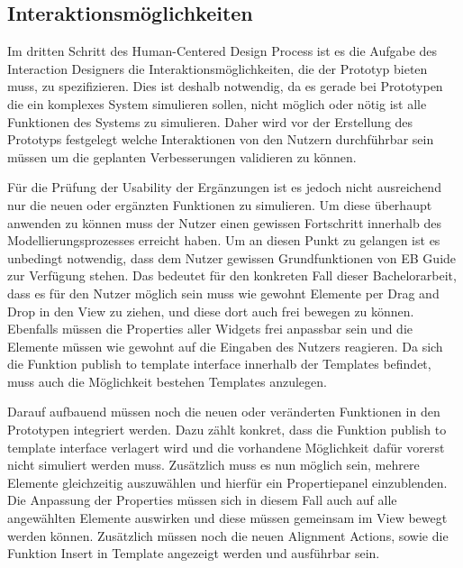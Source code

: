 \subsection{Interaktionsmöglichkeiten}

Im dritten Schritt des Human-Centered Design Process ist es die Aufgabe des Interaction Designers die Interaktionsmöglichkeiten, die der Prototyp bieten muss, zu spezifizieren.
Dies ist deshalb notwendig, da es gerade bei Prototypen die ein komplexes System simulieren sollen, nicht möglich oder nötig ist alle Funktionen des Systems zu simulieren.
Daher wird vor der Erstellung des Prototyps festgelegt welche Interaktionen von den Nutzern durchführbar sein müssen um die geplanten Verbesserungen validieren zu können.

Für die Prüfung der Usability der Ergänzungen ist es jedoch nicht ausreichend nur die neuen oder ergänzten Funktionen zu simulieren.
Um diese überhaupt anwenden zu können muss der Nutzer einen gewissen Fortschritt innerhalb des Modellierungsprozesses erreicht haben.
Um an diesen Punkt zu gelangen ist es unbedingt notwendig, dass dem Nutzer gewissen Grundfunktionen von EB Guide zur Verfügung stehen.
Das bedeutet für den konkreten Fall dieser Bachelorarbeit, dass es für den Nutzer möglich sein muss wie gewohnt Elemente per Drag and Drop in den View zu ziehen, und diese dort auch frei bewegen zu können.
Ebenfalls müssen die Properties aller Widgets frei anpassbar sein und die Elemente müssen wie gewohnt auf die Eingaben des Nutzers reagieren.
Da sich die Funktion \glqq publish to template interface\grqq{} innerhalb der Templates befindet, muss auch die Möglichkeit bestehen Templates anzulegen.

Darauf aufbauend müssen noch die neuen oder veränderten Funktionen in den Prototypen integriert werden.
Dazu zählt konkret, dass die Funktion \glqq publish to template interface\grqq{} verlagert wird und die vorhandene Möglichkeit dafür vorerst nicht simuliert werden muss.
Zusätzlich muss es nun möglich sein, mehrere Elemente gleichzeitig auszuwählen und hierfür ein Propertiepanel einzublenden.
Die Anpassung der Properties müssen sich in diesem Fall auch auf alle angewählten Elemente auswirken und diese müssen gemeinsam im View bewegt werden können.
Zusätzlich müssen noch die neuen Alignment Actions, sowie die Funktion \glqq Insert in Template\grqq{} angezeigt werden und ausführbar sein.

